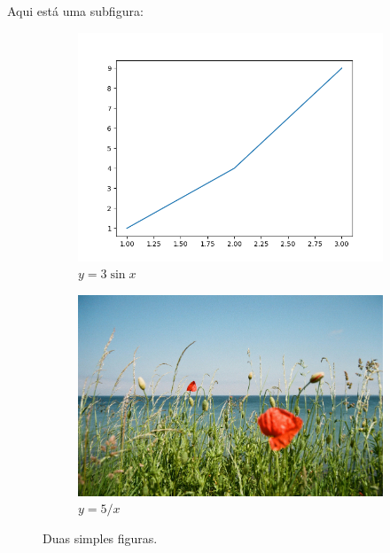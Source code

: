 \documentclass[11pt, a4paper]{article}
\begin{document}
    Aqui está uma subfigura:

    \begin{figure}
        \centering
        \begin{subfigure}[b]{0.45\textwidth}
             \centering
             \includegraphics[width=\textwidth]{figures/figure}
             \caption{$y=3\sin x$}
             \label{fig:three sin x}
         \end{subfigure}
         \hfill
         \begin{subfigure}[b]{0.45\textwidth}
             \centering
             \includegraphics[width=\textwidth]{figures/flores}
             \caption{$y=5/x$}
             \label{fig:five over x}
         \end{subfigure}
            \caption{Duas simples figuras.}
            \label{fig:twographs}
    \end{figure}
\end{document}

